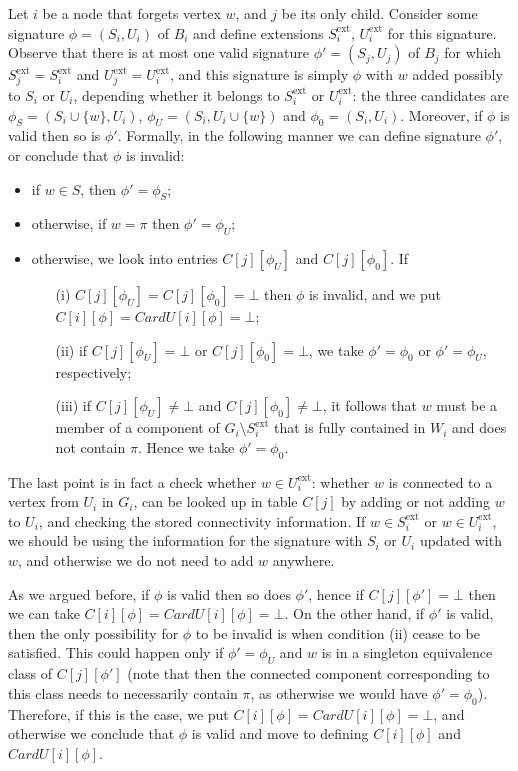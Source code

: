 \documentclass[a4paper,11pt]{article}
\theoremstyle{definition}
\theoremstyle{remark}
\newcommand{\ext}{\textrm{ext}}
\newcommand{\pin}{\pi}
\begin{document}
 Let $i$ be a node that forgets
vertex $w$, and $j$ be its only child.  Consider some signature
$\phi=(S_i,U_i)$ of $B_i$ and define extensions $S^{\ext}_i$,
$U^{\ext}_i$ for this signature.  Observe that there is at most one
valid signature $\phi'=(S_j,U_j)$ of $B_j$ for which
$S^{\ext}_j=S^{\ext}_i$ and $U^{\ext}_j=U^{\ext}_i$, and this
signature is simply $\phi$ with $w$ added possibly to $S_i$ or $U_i$,
depending whether it belongs to $S^{\ext}_i$ or $U^{\ext}_i$: the
three candidates are $\phi_S=(S_i\cup \{w\},U_i)$,
$\phi_U=(S_i,U_i\cup \{w\})$ and $\phi_0=(S_i,U_i)$.
Moreover, if $\phi$ is valid then so is $\phi'$.  Formally, in the
following manner we can define signature $\phi'$, or conclude that $\phi$
is invalid:
\begin{itemize}
\item if $w\in S$, then $\phi'=\phi_S$;
\item otherwise, if $w=\pin$ then $\phi'=\phi_U$;
\item otherwise, we look into entries $C[j][\phi_U]$ and $C[j][\phi_0]$.  If
  \begin{itemize}
  \item[(i)] $C[j][\phi_U]=C[j][\phi_0]=\bot$ then $\phi$ is invalid, and we 
    put
    $C[i][\phi]=CardU[i][\phi]=\bot$;
  \item[(ii)] if $C[j][\phi_U]=\bot$ or $C[j][\phi_0]=\bot$, we take 
    $\phi'=\phi_0$ or
    $\phi'=\phi_U$, respectively;
  \item[(iii)] if $C[j][\phi_U]\neq\bot$ and $C[j][\phi_0]\neq\bot$, it follows 
    that $w$
    must be a member of a component of $G_i\setminus S^{\ext}_i$ that
    is fully contained in $W_i$ and does not contain $\pin$.  Hence we
    take $\phi'=\phi_0$.
  \end{itemize}
\end{itemize}
The last point is in fact a check whether $w\in U^{\ext}_i$: whether $w$
is connected to a vertex from $U_i$ in $G_i$, can be looked up in
table $C[j]$ by adding or not adding $w$ to $U_i$, and checking the
stored connectivity information.  If $w\in S^{\ext}_i$ or $w\in
U^{\ext}_i$, we should be using the information for the signature with
$S_i$ or $U_i$ updated with $w$, and otherwise we do not need to add
$w$ anywhere.

As we argued before, if $\phi$ is valid then so does $\phi'$, hence if
$C[j][\phi']=\bot$ then we can take $C[i][\phi]=CardU[i][\phi]=\bot$.
On the other hand, if $\phi'$ is valid, then the only possibility for
$\phi$ to be invalid is when condition (ii) cease to be satisfied.
This could happen only if $\phi'=\phi_U$ and $w$ is in a singleton
equivalence class of $C[j][\phi']$ (note that then the connected
component corresponding to this class needs to necessarily contain
$\pin$, as otherwise we would have $\phi'=\phi_0$).
Therefore, if this is the case, we put
$C[i][\phi]=CardU[i][\phi]=\bot$, and otherwise we conclude that
$\phi$ is valid and move to defining $C[i][\phi]$ and $CardU[i][\phi]$.
\end{document}
